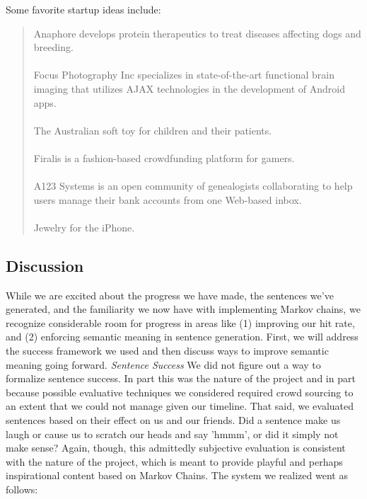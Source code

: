 \documentclass[11pt]{article}
\begin{document}
Some favorite startup ideas include:
\begin{quote}
Anaphore develops protein therapeutics to treat diseases affecting dogs and breeding.\\\\
Focus Photography Inc specializes in state-of-the-art functional brain imaging that utilizes AJAX technologies in the development of Android apps.\\\\
The Australian soft toy for children and their patients.\\\\
Firalis is a fashion-based crowdfunding platform for gamers.\\\\
A123 Systems is an open community of genealogists collaborating to help users manage their bank accounts from one Web-based inbox.\\\\
Jewelry for the iPhone.
\end{quote}

\subsection{Discussion}


While we are excited about the progress we have made, the sentences we've generated, and the familiarity we now have with implementing Markov chains, we recognize considerable room for progress in areas like (1) improving our hit rate, and (2) enforcing semantic meaning in sentence generation. First, we will address the success framework we used and then discuss ways to improve semantic meaning going forward. 
\newline
\textit{Sentence Success}
\newline
We did not figure out a way to formalize sentence success. In part this was the nature of the project and in part because possible evaluative techniques we considered required crowd sourcing to an extent that we could not manage given our timeline. That said, we evaluated sentences based on their effect on us and our friends. Did a sentence make us laugh or cause us to scratch our heads and say 'hmmm', or did it simply not make sense? Again, though, this admittedly subjective evaluation is consistent with the nature of the project, which is meant to provide playful and perhaps inspirational content based on Markov Chains. The system we realized went as follows:
\end{document}
